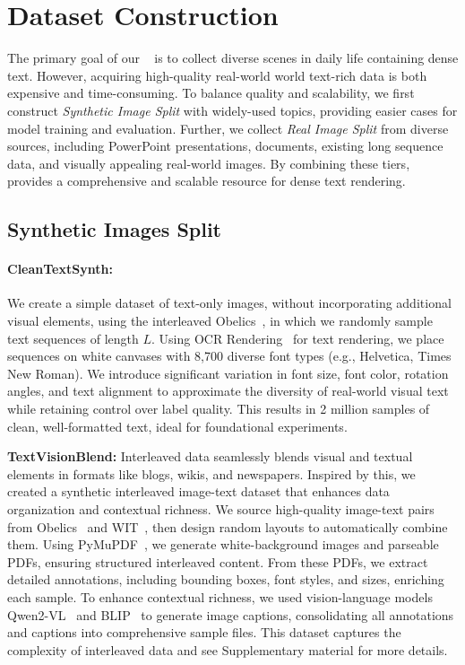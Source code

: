\section{Dataset Construction}

The primary goal of our \DatasetName~ is to collect diverse scenes in daily life containing dense text. 
However, acquiring high-quality real-world world text-rich data is both expensive and time-consuming. 
To balance quality and scalability, we first construct \textit{Synthetic Image Split} with widely-used topics, providing easier cases for model training and evaluation.
Further, we collect \textit{Real Image Split} from diverse sources, including PowerPoint presentations, documents, existing long sequence data, and visually appealing real-world images.
By combining these tiers, \DatasetName~ provides a comprehensive and scalable resource for dense text rendering.




\subsection{Synthetic Images Split}


\paragraph{CleanTextSynth:}
We create a simple dataset of text-only images, without incorporating additional visual elements, using the interleaved Obelics~\cite{obelics}, in which we randomly sample text sequences of length $L$.
Using OCR Rendering~\cite{ocr_rendering} for text rendering, we place sequences on white canvases with 8,700 diverse font types (e.g., Helvetica, Times New Roman). 
We introduce significant variation in font size, font color, rotation angles, and text alignment to approximate the diversity of real-world visual text while retaining control over label quality.
This results in 2 million samples of clean, well-formatted text, ideal for foundational experiments.


\textbf{TextVisionBlend: }
Interleaved data seamlessly blends visual and textual elements in formats like blogs, wikis, and newspapers. Inspired by this, we created a synthetic interleaved image-text dataset that enhances data organization and contextual richness.
We source high-quality image-text pairs from Obelics~\cite{obelics} and WIT~\cite{wit}, then design random layouts to automatically combine them. 
Using PyMuPDF~\cite{pymupdf}, we generate white-background images and parseable PDFs, ensuring structured interleaved content. From these PDFs, we extract detailed annotations, including bounding boxes, font styles, and sizes, enriching each sample.
To enhance contextual richness, we used vision-language models Qwen2-VL~\cite{qwen2_vl} and BLIP~\cite{blip} to generate image captions, consolidating all annotations and captions into comprehensive sample files. 
This dataset captures the complexity of interleaved data and see Supplementary material for more details.

